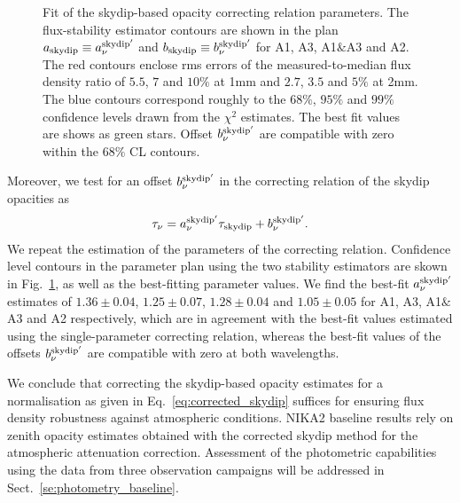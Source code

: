 \begin{figure}[ht!]
\begin{center}
    \caption[NIKA2 skydip-based opacity correcting
    relation]{Fit of the skydip-based opacity correcting relation
    parameters.
    The flux-stability estimator contours are shown in the plan
    $a_{\rm{skydip}} \equiv a_\nu^{\rm{skydip}'}$ and
    $b_{\rm{skydip}} \equiv b_\nu^{\rm{skydip}'}$
    for A1, A3, A1$\&$A3 and A2.
    The red contours enclose rms
    errors of the measured-to-median flux density ratio of $5.5$, $7$
    and $10\%$ at 1mm and $2.7$, $3.5$ and $5\%$ at 2mm. The blue
    contours correspond roughly to the $68\%$, $95\%$ and $99\%$
    confidence levels drawn from the $\chi^2$ estimates.
    The best fit values are shows as green stars. Offset
    $b_\nu^{\rm{skydip}'}$ are compatible with zero within the $68\%$
    CL contours.} 
\label{fig:skydip_fit}
\end{center}
\end{figure}

Moreover, we test for an offset $b_\nu^{\rm{skydip}'}$ in the
correcting relation of the skydip opacities as 
\begin{equation}  
  \tau_\nu =  a_\nu^{\rm{skydip}'}\tau_{\rm{skydip}} + b_\nu^{\rm{skydip}'}.      
\end{equation}
We repeat the estimation of the parameters of the correcting
relation. Confidence level contours in the parameter plan using the
two stability estimators are skown in Fig.~\ref{fig:skydip_fit}, as
well as the
best-fitting parameter values.
We find the best-fit $a_\nu^{\rm{skydip}'}$ estimates of
$1.36 \pm 0.04$,
$1.25 \pm 0.07$,
$1.28 \pm 0.04$ and
$1.05 \pm 0.05$ for A1, A3, A1$\&$A3 and A2 respectively, which are in
agreement with the best-fit values estimated using the single-parameter
correcting relation, whereas the best-fit values of the offsets
$b_\nu^{\rm{skydip}'}$ are compatible with zero at both wavelengths.

We conclude that correcting the skydip-based opacity estimates for a
normalisation as given in Eq.~\ref{eq:corrected_skydip} suffices for
ensuring flux density robustness against atmospheric conditions.
NIKA2 baseline results rely on zenith opacity estimates obtained with
the corrected skydip method for the atmospheric attenuation
correction. Assessment of the photometric capabilities using the data
from three observation campaigns will be addressed in
Sect.~\ref{se:photometry_baseline}.



